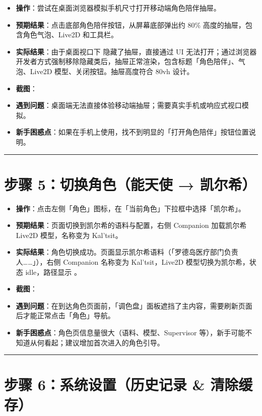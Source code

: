 \documentclass[12pt,a4paper]{ctexart}
\begin{document}
\begin{itemize}[leftmargin=2em]
\item \textbf{操作}：尝试在桌面浏览器模拟手机尺寸打开移动端角色陪伴抽屉。
\item \textbf{预期结果}：点击底部角色陪伴按钮，从屏幕底部弹出约 80\% 高度的抽屉，包含角色气泡、Live2D 和工具栏。
\item \textbf{实际结果}：由于桌面视口下  隐藏了抽屉，直接通过 UI 无法打开；通过浏览器开发者方式强制移除隐藏类后，抽屉正常渲染，包含标题「角色陪伴」、气泡、Live2D 模型、关闭按钮。抽屉高度符合 80vh 设计。
\item \textbf{截图}：
\item \textbf{遇到问题}：桌面端无法直接体验移动端抽屉；需要真实手机或响应式视口模拟。
\item \textbf{新手困惑点}：如果在手机上使用，找不到明显的「打开角色陪伴」按钮位置说明。
\end{itemize}

\hrule


\section{步骤 5：切换角色（能天使 → 凯尔希）}

\begin{itemize}[leftmargin=2em]
\item \textbf{操作}：点击左侧「角色」图标，在「当前角色」下拉框中选择「凯尔希」。
\item \textbf{预期结果}：页面切换到凯尔希的语料与配置，右侧 Companion 加载凯尔希 Live2D 模型，名称变为 Kal'tsit。
\item \textbf{实际结果}：角色切换成功。页面显示凯尔希语料（「罗德岛医疗部门负责人……」），右侧 Companion 名称变为 Kal'tsit，Live2D 模型切换为凯尔希，状态 idle，路径显示 。
\item \textbf{截图}：
\item \textbf{遇到问题}：在到达角色页面前，「调色盘」面板遮挡了主内容，需要刷新页面后才能正常点击「角色」导航。
\item \textbf{新手困惑点}：角色页信息量很大（语料、模型、Supervisor 等），新手可能不知道从何看起；建议增加首次进入的角色引导。
\end{itemize}

\hrule


\section{步骤 6：系统设置（历史记录 \& 清除缓存）}
\end{document}
